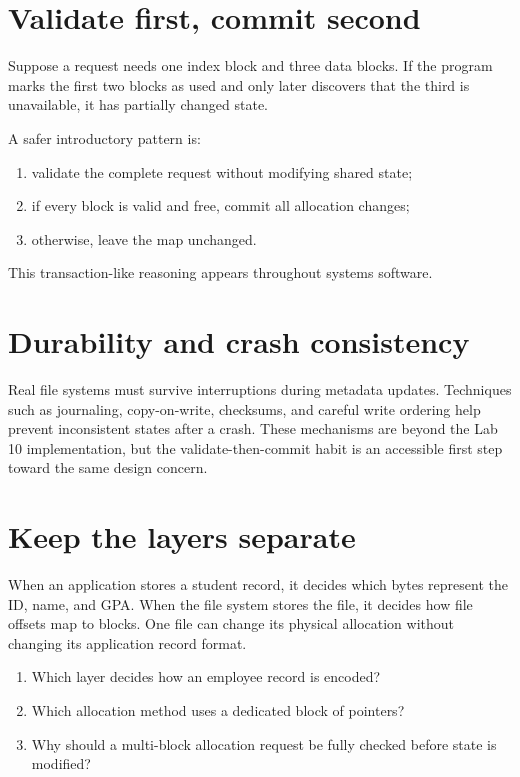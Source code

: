\section{Validate first, commit second}
Suppose a request needs one index block and three data blocks. If the program marks the first two blocks as used and only later discovers that the third is unavailable, it has partially changed state.

A safer introductory pattern is:
\begin{enumerate}
  \item validate the complete request without modifying shared state;
  \item if every block is valid and free, commit all allocation changes;
  \item otherwise, leave the map unchanged.
\end{enumerate}
This transaction-like reasoning appears throughout systems software.

\section{Durability and crash consistency}
Real file systems must survive interruptions during metadata updates. Techniques such as journaling, copy-on-write, checksums, and careful write ordering help prevent inconsistent states after a crash. These mechanisms are beyond the Lab 10 implementation, but the validate-then-commit habit is an accessible first step toward the same design concern.

\section{Keep the layers separate}
When an application stores a student record, it decides which bytes represent the ID, name, and GPA. When the file system stores the file, it decides how file offsets map to blocks. One file can change its physical allocation without changing its application record format.

\begin{quickcheck}
\begin{enumerate}
  \item Which layer decides how an employee record is encoded?
  \item Which allocation method uses a dedicated block of pointers?
  \item Why should a multi-block allocation request be fully checked before state is modified?
\end{enumerate}
\end{quickcheck}
